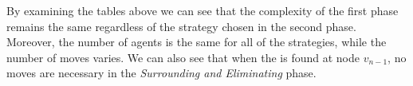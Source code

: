 \begin{center}
\end{center}



By examining the tables above we can see that the complexity of the first phase remains the same regardless of the strategy chosen  in the second phase.
Moreover, the number of agents is the same for all of the strategies, while the number of moves varies. We can also see that when the \bv is found at node $v_{n-1}$, no moves are necessary in the {\em Surrounding and Eliminating} phase. 
 



 

